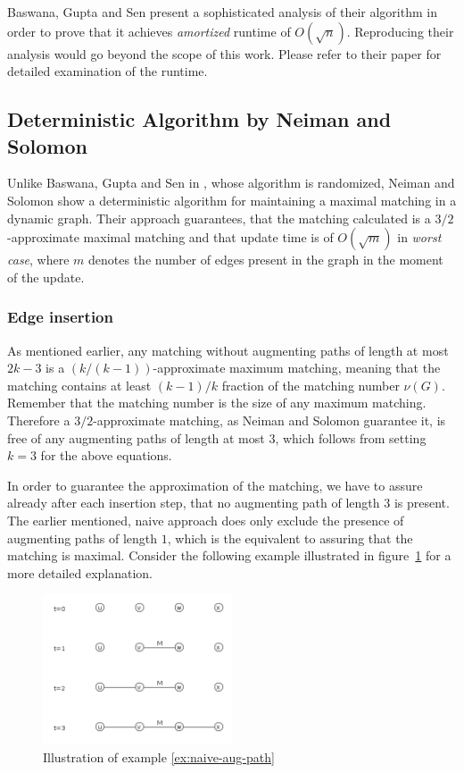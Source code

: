 \documentclass{article}      %
\begin{document}
Baswana, Gupta and Sen present a sophisticated analysis of their algorithm in order to prove that it achieves \emph{amortized} runtime of $O(\sqrt{n})$. Reproducing their analysis would go beyond the scope of this work. Please refer to their paper \cite{bgs} for detailed examination of the runtime.

\subsection{Deterministic Algorithm by Neiman and Solomon}
\label{sec:ns}

Unlike Baswana, Gupta and Sen in \cite{bgs}, whose algorithm is randomized, Neiman and Solomon \cite{ns} show a deterministic algorithm for maintaining a maximal matching in a dynamic graph. Their approach guarantees, that the matching calculated is a $3/2$-approximate maximal matching and that update time is of $O(\sqrt{m})$ in \emph{worst case}, where $m$ denotes the number of edges present in the graph in the moment of the update.

\subsubsection{Edge insertion}
\label{sec:ns-edge-in}

As mentioned earlier, any matching without augmenting paths of length at most $2k-3$ is a $(k/(k-1))$-approximate maximum matching, meaning that the matching contains at least $(k-1)/k$ fraction of the matching number $\nu(G)$. Remember that the matching number is the size of any maximum matching. Therefore a $3/2$-approximate matching, as Neiman and Solomon guarantee it, is free of any augmenting paths of length at most $3$, which follows from setting $k=3$ for the above equations.

In order to guarantee the approximation of the matching, we have to assure already after each insertion step, that no augmenting path of length $3$ is present. The earlier mentioned, naive approach does only exclude the presence of augmenting paths of length $1$, which is the equivalent to assuring that the matching is maximal. Consider the following example illustrated in figure~\ref{fig:example-4-3-1} for a more detailed explanation.

\begin{figure}
\center 
\includegraphics[width=0.5\textwidth]{example-4-3-1.png}
\caption{Illustration of example \ref{ex:naive-aug-path}}
\label{fig:example-4-3-1}
\end{figure}
\end{document}
